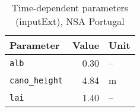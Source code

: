 \begin{table}[ht]
\centering
\caption{Time-dependent parameters (\textsf{inputExt}), NSA Portugal} 
\label{tab:portugalNSA_inputExt}
\begin{tabular}{lrl}
  \hline
Parameter & Value & Unit \\ 
  \hline
\verb!alb! & 0.30 & -- \\ 
  \verb!cano_height! & 4.84 & m \\ 
  \verb!lai! & 1.40 & -- \\ 
   \hline
\end{tabular}
\end{table}
